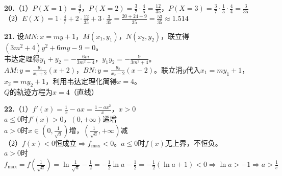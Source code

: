 \documentclass[12pt,a4paper]{ctexart}
\begin{document}
\textbf{20.}（1）$P(X=1)=\frac47$，$P(X=2)=\frac37\cdot\frac45=\frac{12}{35}$，$P(X=3)=\frac37\cdot\frac15\cdot\frac44=\frac3{35}$\\
（2）$E(X)=1\cdot\frac47+2\cdot\frac{12}{35}+3\cdot\frac3{35}=\frac{20+24+9}{35}=\frac{53}{35}\approx1.514$

\textbf{21.} 设$MN:x=my+1$，$M(x_1,y_1)$，$N(x_2,y_2)$，联立得$(3m^2+4)y^2+6my-9=0$。\\
韦达定理得$y_1+y_2=-\frac{6m}{3m^2+4}$，$y_1y_2=-\frac{9}{3m^2+4}$。\\
$AM:y=\frac{y_1}{x_1+2}(x+2)$，$BN:y=\frac{y_2}{x_2-2}(x-2)$。联立消$y$代入$x_1=my_1+1$，$x_2=my_2+1$，利用韦达定理化简得$x=4$。\\
$Q$的轨迹方程为$x=4$（直线）

\textbf{22.}（1）$f'(x)=\frac1x-ax=\frac{1-ax^2}{x}$，$x>0$\\
$a\le0$时$f'(x)>0$，$(0,+\infty)$递增\\
$a>0$时$x\in(0,\frac1{\sqrt a})$增，$(\frac1{\sqrt a},+\infty)$减\\
（2）$f(x)<0$恒成立$\Rightarrow f_{\max}<0$。$a\le0$时$f(x)$无上界，不恒负。\\
$a>0$时$f_{\max}=f(\frac1{\sqrt a})=\ln\frac1{\sqrt a}-\frac12=-\frac12\ln a-\frac12=-\frac12(\ln a+1)<0\Rightarrow\ln a>-1\Rightarrow a>\frac1e$
\end{document}
